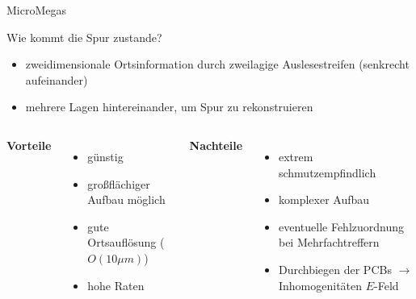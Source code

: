 \begin{frame}{MicroMegas}

	\begin{block}{Wie kommt die Spur zustande?}
		\begin{itemize}
		  \item zweidimensionale Ortsinformation durch zweilagige Auslesestreifen (senkrecht aufeinander)
		  \item mehrere Lagen hintereinander, um Spur zu rekonstruieren
		\end{itemize}
	\end{block}
	\vspace{0.8cm}
    \begin{columns}[T]
			\textbf{Vorteile}		
			\begin{itemize}
			  \item günstig
			  \item großflächiger Aufbau möglich 
			  \item gute Ortsauflösung ($O(10\mu m)$)
			  \item hohe Raten
			\end{itemize}	
	    	\textbf{Nachteile}
	    	\begin{itemize}
			  \item extrem schmutzempfindlich
			  \item komplexer Aufbau
			  \item eventuelle Fehlzuordnung bei Mehrfachtreffern
			  \item Durchbiegen der PCBs $\rightarrow$ Inhomogenitäten $E$-Feld
			\end{itemize}
    \end{columns}
    \vspace{1cm}
\end{frame}

